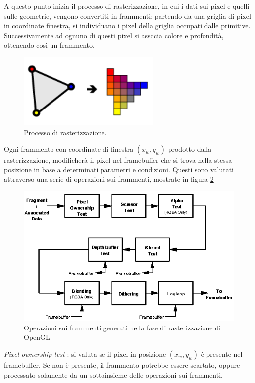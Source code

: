 A questo punto inizia il processo di rasterizzazione, in cui i dati sui pixel e quelli sulle geometrie, vengono convertiti in frammenti: partendo da una griglia di pixel in coordinate finestra, si individuano i pixel della griglia occupati dalle primitive. Successivamente ad ognuno di questi pixel si associa colore e profondità, ottenendo così un frammento. 
\\
\begin{figure}[htb]
 \centering
 \includegraphics[width=0.4\linewidth]{images/chapter_stato_arte/stato_arte_raster.png}\hfill
 \caption[Rasterizzazione OpenGL]{Processo di rasterizzazione.}
 \label{fig:stato_arte_raster}
\end{figure}

Ogni frammento con coordinate di finestra $(x_w,y_w)$ prodotto dalla rasterizzazione, modificherà il pixel nel framebuffer che si trova nella stessa posizione in base a determinati parametri e condizioni. Questi sono valutati attraverso una serie di operazioni sui frammenti, mostrate in figura \ref{fig:stato_arte_frag_op}
\begin{figure}[htb]
 \centering
 \includegraphics[width=0.9\linewidth]{images/chapter_stato_arte/stato_arte_frag_op.png}\hfill
 \caption[Operazioni sui frammenti]{Operazioni sui frammenti generati nella fase di rasterizzazione di OpenGL.}
 \label{fig:stato_arte_frag_op}
\end{figure}
\emph{Pixel ownership test} : si valuta se il pixel in posizione $(x_w,y_w)$ è presente nel framebuffer. Se non è presente, il frammento potrebbe essere scartato, oppure processato solamente da un sottoinsieme delle operazioni sui frammenti.
\\

